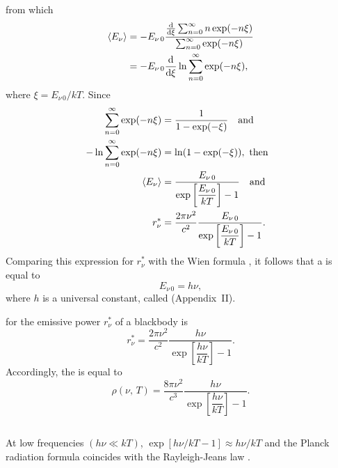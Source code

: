 from which
\begin{align*}%
\expval{E_{\nu}} & = -  E_{\nu\, 0}  \frac{\dv{\xi} \sum_{n =0}^{\infty} n \exp (-n \xi)}{\sum_{n =0}^{\infty} \exp (- n \xi)}\\
& = -  E_{\nu\, 0}\dv{\xi} \ln \sum_{n =0}^{\infty} \exp (- n \xi),
\end{align*}
where $\xi = E_{\nu \,0}/kT$. Since
\begin{align*}%
\sum_{n =0}^{\infty} \exp (- n \xi) & = \frac{1}{1 - \exp(-\xi)} \qand \\
-\ln \sum_{n =0}^{\infty} \exp (- n \xi) & = \ln (1 - \exp(-\xi)), \text{ then} \\
\expval{E_{\nu}} & =   \frac{E_{\nu\, 0}}{\exp \left[ \dfrac{E_{\nu\, 0}}{kT}\right] -1} \qand \\
r_{\nu}^{*} & =  \frac{2\pi \nu^{2}}{c^{2}} \frac{E_{\nu\, 0}}{\exp \left[ \dfrac{E_{\nu\, 0}}{kT}\right] -1}.
\end{align*}
Comparing this expression for $r_{\nu}^{*}$ with the Wien formula , it follows that a  is equal to
\begin{equation*}%
E_{\nu\, 0} = h\nu,
\end{equation*}
where $h$ is a universal constant, called  (Appendix~II).

 for the emissive power $r_{\nu}^{*}$ of a blackbody is
\begin{equation*}%
r_{\nu}^{*} =  \frac{2\pi \nu^{2}}{c^{2}} \frac{h \nu}{\exp \left[ \dfrac{h \nu}{kT}\right] -1}.
\end{equation*}
Accordingly, the   is equal to
\begin{equation*}%
\rho (\nu, \, T)  =  \frac{8\pi \nu^{2}}{c^{3}} \frac{h \nu}{\exp \left[ \dfrac{h \nu}{kT}\right] -1}.
\end{equation*}

\subsection{}\label{36.3.3} At low frequencies $(h \nu \ll kT)$, $\exp [h\nu/kT - 1] \approx h\nu/kT$ and the Planck radiation formula coincides with the Rayleigh-Jeans law .

